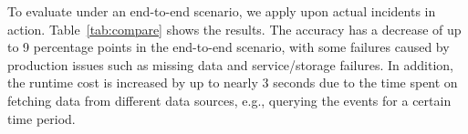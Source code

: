 \begin{table}[]
\centering
\caption{Comparison of \system results on the dataset and end-to-end scenario}
\label{tab:compare}
 \vspace{-3.0ex} 
\end{table}

To evaluate \system under an end-to-end scenario, we apply \system  upon actual incidents in action. Table~\ref{tab:compare} shows the results. The accuracy has a decrease of up to 9 percentage points in the end-to-end scenario, with some failures caused by production issues such as missing data and service/storage failures. In addition, the runtime cost is increased by up to nearly 3 seconds due to the time spent on fetching data from different data sources, e.g., querying the events for a certain time period.


